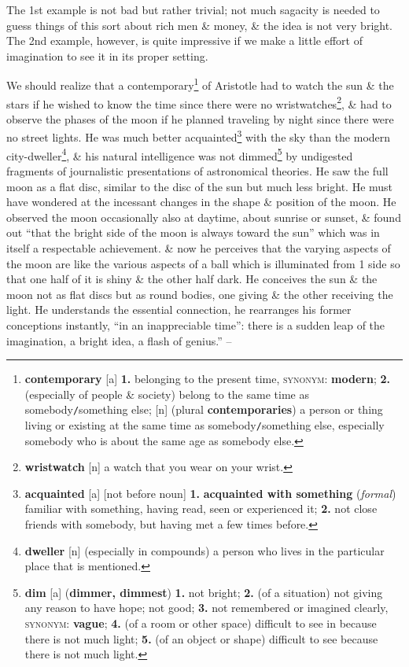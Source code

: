 \documentclass[oneside]{book}
\numberwithin{equation}{section}
\begin{document}
The 1st example is not bad but rather trivial; not much sagacity is needed to guess things of this sort about rich men \& money, \& the idea is not very bright. The 2nd example, however, is quite impressive if we make a little effort of imagination to see it in its proper setting.

We should realize that a contemporary\footnote{\textbf{contemporary} [a] \textbf{1.} belonging to the present time, \textsc{synonym}: \textbf{modern}; \textbf{2.} (especially of people \& society) belong to the same time as somebody\texttt{/}something else; [n] (plural \textbf{contemporaries}) a person or thing living or existing at the same time as somebody\texttt{/}something else, especially somebody who is about the same age as somebody else.} of Aristotle had to watch the sun \& the stars if he wished to know the time since there were no wristwatches\footnote{\textbf{wristwatch} [n] a watch that you wear on your wrist.}, \& had to observe the phases of the moon if he planned traveling by night since there were no street lights. He was much better acquainted\footnote{\textbf{acquainted} [a] [not before noun] \textbf{1.} \textbf{acquainted with something} (\textit{formal}) familiar with something, having read, seen or experienced it; \textbf{2.} not close friends with somebody, but having met a few times before.} with the sky than the modern city-dweller\footnote{\textbf{dweller} [n] (especially in compounds) a person who lives in the particular place that is mentioned.}, \& his natural intelligence was not dimmed\footnote{\textbf{dim} [a] (\textbf{dimmer, dimmest}) \textbf{1.} not bright; \textbf{2.} (of a situation) not giving any reason to have hope; not good; \textbf{3.} not remembered or imagined clearly, \textsc{synonym}: \textbf{vague}; \textbf{4.} (of a room or other space) difficult to see in because there is not much light; \textbf{5.} (of an object or shape) difficult to see because there is not much light.} by undigested fragments of journalistic presentations of astronomical theories. He saw the full moon as a flat disc, similar to the disc of the sun but much less bright. He must have wondered at the incessant changes in the shape \& position of the moon. He observed the moon occasionally also at daytime, about sunrise or sunset, \& found out ``that the bright side of the moon is always toward the sun'' which was in itself a respectable achievement. \& now he perceives that the varying aspects of the moon are like the various aspects of a ball which is illuminated from 1 side so that one half of it is shiny \& the other half dark. He conceives the sun \& the moon not as flat discs but as round bodies, one giving \& the other receiving the light. He understands the essential connection, he rearranges his former conceptions instantly, ``in an inappreciable time'': there is a sudden leap of the imagination, a bright idea, a flash of genius.'' -- \cite[pp. 58--]{Polya2014}
\end{document}
